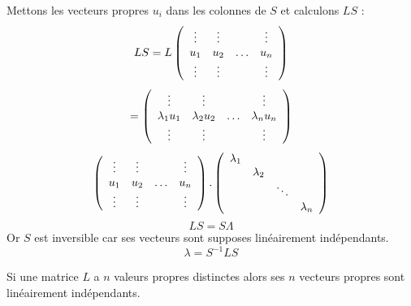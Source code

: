 \documentclass[12pt]{book}
\begin{document}
\begin{pf}
Mettons les vecteurs propres $u_i$ dans les colonnes de $S$ et
calculons $LS$ :
\begin{equation}
LS=L \left( \begin{array}{cccc}
              \vdots&\vdots& &\vdots\cr
               u_1&u_2&\ldots&u_n\cr 
              \vdots&\vdots& &\vdots\cr
\end{array} \right)
\end{equation}
\begin{equation}
=
\left( \begin{array}{cccc}
              \vdots&\vdots& &\vdots\cr
              \lambda_1 u_1&\lambda_2 u_2&\ldots&\lambda_n u_n\cr
              \vdots&\vdots& &\vdots\cr
\end{array} \right)
\end{equation}
\begin{equation}
\left( \begin{array}{cccc}
\vdots&\vdots& &\vdots\cr
              u_1&u_2&\ldots&u_n\cr
              \vdots&\vdots&
&\vdots\cr
\end{array} \right)
.
\left( \begin{array}{cccc}
\lambda_1& & &\cr
&\lambda_2&&\cr
&&\ddots&\cr
&&&\lambda_n
\end{array} \right)
\end{equation}
\begin{equation}
LS=S\Lambda
\end{equation}
Or $S$ est inversible car ses vecteurs sont supposes lin\'eairement
ind\'ependants.
\begin{equation}
\lambda=S^{-1}LS
\end{equation}
\end{pf}
\begin{rem}\label{remmatrindep}
Si une matrice $L$ a $n$ valeurs propres distinctes alors ses $n$
vecteurs propres sont lin\'eairement ind\'ependants.
\end{rem}
\end{document}
